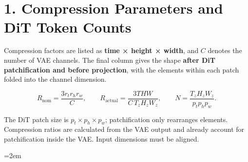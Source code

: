 \documentclass[
  11pt,
  a4paper,
]{article}
\author{}
\date{}
\newcommand{\NotesTableStyle}{\linespread{1}\fontsize{9.5pt}{13pt}\selectfont\setlength{\tabcolsep}{4pt}\renewcommand{\arraystretch}{1.1}\setlength{\extrarowheight}{5pt}\setlength{\LTpre}{5pt}\setlength{\LTpost}{6pt}\setlength{\parskip}{0pt}\emergencystretch=2em}
\begin{document}
\vspace{1mm}{\color{notesblue}\rule{\linewidth}{0.8pt}}\vspace{1mm}

\section{1. Compression Parameters and DiT Token
Counts}\label{compression-parameters-and-dit-token-counts}

Compression factors are listed as \textbf{time × height × width}, and
\(C\) denotes the number of VAE channels. The final column gives the
shape \textbf{after DiT patchification and before projection}, with the
elements within each patch folded into the channel dimension.

\[
R_{\mathrm{nom}}=\frac{3r_t r_h r_w}{C},\qquad
R_{\mathrm{actual}}=\frac{3THW}{C\,T_zH_zW_z},\qquad
N=\frac{T_zH_zW_z}{p_tp_hp_w}.
\]

The DiT patch size is \(p_t\times p_h\times p_w\); patchification only
rearranges elements. Compression ratios are calculated from the VAE
output and already account for patchification inside the VAE. Input
dimensions must be aligned.

\begingroup\NotesTableStyle\fontsize{8.25pt}{9.5pt}\selectfont\renewcommand{\arraystretch}{1.0}\setlength{\extrarowheight}{1pt}
\end{document}
